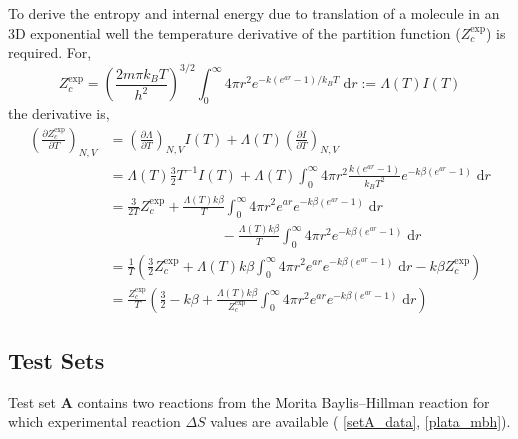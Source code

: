 \documentclass[../main.tex]{subfiles}
\begin{document}
To derive the entropy and internal energy due to translation of a molecule in an 3D exponential well the temperature derivative of the partition function ($Z_c^\text{exp}$) is required. For,
\begin{equation}
	Z_c^\text{exp} =\left(\frac{2m\pi k_B T}{h^2} \right)^{3/2} \int_0^\infty 4\pi r^2 e^{- k(e^{ar} - 1) / k_B T} \; \text{d}r :=  \Lambda(T) I(T)
\end{equation}
the derivative is,
\begin{equation}
	\begin{aligned}
		\left(\frac{\partial Z_c^\text{exp}}{\partial T}\right)_{N , V} &= \left(\frac{\partial \Lambda}{\partial T}\right)_{N , V} I(T) + \Lambda(T)\left(\frac{\partial I}{\partial T}\right)_{N , V} \\
		&= \Lambda(T) \frac{3}{2}T^{-1} I(T) + \Lambda(T) \int_0^\infty 4\pi r^2 \frac{k(e^{ar} - 1)}{k_B T^2}  e^{- k\beta (e^{ar} - 1)} \; \text{d}r \\
		&= \frac{3}{2T} Z_c^\text{exp} + \frac{\Lambda(T) k\beta}{T} \int_0^\infty 4\pi r^2 e^{ar}  e^{- k\beta(e^{ar} - 1)} \; \text{d}r \\
		&\qquad\qquad\qquad\qquad-  \frac{\Lambda(T) k\beta}{T}  \int_0^\infty 4\pi r^2 e^{- k\beta(e^{ar} - 1)} \; \text{d}r \\
		&= \frac{1}{T} \left(  \frac{3}{2} Z_c^\text{exp} + \Lambda(T) k\beta \int_0^\infty 4\pi r^2 e^{ar}  e^{- k\beta(e^{ar} - 1)} \; \text{d}r -  k\beta Z_c^\text{exp} \right) \\
		&= \frac{Z_c^\text{exp}}{T} \left( \frac{3}{2} - k\beta + \frac{\Lambda(T) k\beta}{Z_c^\text{exp}} \int_0^\infty 4\pi r^2 e^{ar}  e^{- k\beta(e^{ar} - 1)} \; \text{d}r
		\right)
	\end{aligned}
\end{equation}


\clearpage
\subsection{Test Sets} \label{section::appendix_entropy_test_cases}

Test set {\bfseries{A}} contains two reactions from the Morita Baylis--Hillman reaction for which experimental reaction $\Delta S$ values are available (\tablename{ \ref{setA_data}}, \figurename{ \ref{plata_mbh}}).\cite{Plata2015}
\end{document}
